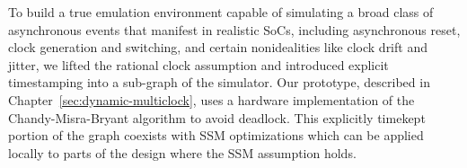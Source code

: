 To build a true emulation environment capable of simulating a broad class of
asynchronous events that manifest in realistic SoCs, including asynchronous
reset, clock generation and switching, and certain nonidealities like clock
drift and jitter, we lifted the rational clock assumption and introduced explicit
timestamping into a sub-graph of the simulator. Our prototype,
described in Chapter~\ref{sec:dynamic-multiclock}, uses a hardware
implementation of the Chandy-Misra-Bryant algorithm to avoid
deadlock. This explicitly timekept portion of the graph coexists with SSM
optimizations which can be applied locally to parts of the design where the SSM
assumption holds.
